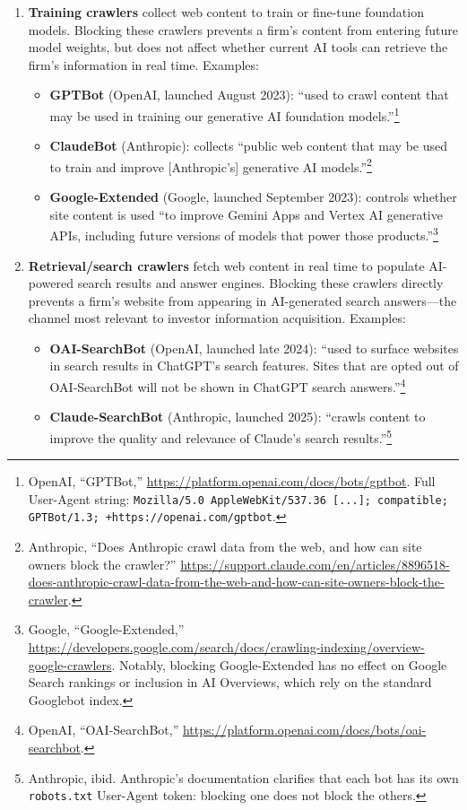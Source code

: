 \documentclass[12pt,a4paper]{article}
\begin{document}
\begin{enumerate}[label=(\alph*)]
    \item \textbf{Training crawlers} collect web content to train or fine-tune foundation models. Blocking these crawlers prevents a firm's content from entering future model weights, but does not affect whether current AI tools can retrieve the firm's information in real time. Examples:
    \begin{itemize}
        \item \textbf{GPTBot} (OpenAI, launched August 2023): ``used to crawl content that may be used in training our generative AI foundation models.''\footnote{OpenAI, ``GPTBot,'' \url{https://platform.openai.com/docs/bots/gptbot}. Full User-Agent string: \texttt{Mozilla/5.0 AppleWebKit/537.36 [...]; compatible; GPTBot/1.3; +https://openai.com/gptbot}.}
        \item \textbf{ClaudeBot} (Anthropic): collects ``public web content that may be used to train and improve [Anthropic's] generative AI models.''\footnote{Anthropic, ``Does Anthropic crawl data from the web, and how can site owners block the crawler?'' \url{https://support.claude.com/en/articles/8896518-does-anthropic-crawl-data-from-the-web-and-how-can-site-owners-block-the-crawler}.}
        \item \textbf{Google-Extended} (Google, launched September 2023): controls whether site content is used ``to improve Gemini Apps and Vertex AI generative APIs, including future versions of models that power those products.''\footnote{Google, ``Google-Extended,'' \url{https://developers.google.com/search/docs/crawling-indexing/overview-google-crawlers}. Notably, blocking Google-Extended has no effect on Google Search rankings or inclusion in AI Overviews, which rely on the standard Googlebot index.}
    \end{itemize}

    \item \textbf{Retrieval/search crawlers} fetch web content in real time to populate AI-powered search results and answer engines. Blocking these crawlers directly prevents a firm's website from appearing in AI-generated search answers---the channel most relevant to investor information acquisition. Examples:
    \begin{itemize}
        \item \textbf{OAI-SearchBot} (OpenAI, launched late 2024): ``used to surface websites in search results in ChatGPT's search features. Sites that are opted out of OAI-SearchBot will not be shown in ChatGPT search answers.''\footnote{OpenAI, ``OAI-SearchBot,'' \url{https://platform.openai.com/docs/bots/oai-searchbot}.}
        \item \textbf{Claude-SearchBot} (Anthropic, launched 2025): ``crawls content to improve the quality and relevance of Claude's search results.''\footnote{Anthropic, ibid. Anthropic's documentation clarifies that each bot has its own \texttt{robots.txt} User-Agent token: blocking one does not block the others.}
    \end{itemize}


\end{enumerate}
\end{document}
